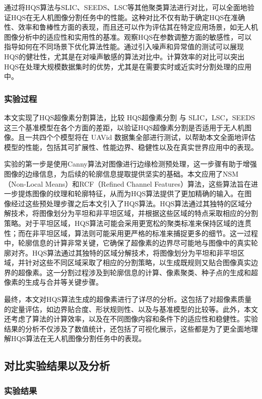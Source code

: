 通过将HQS算法与SLIC、SEEDS、LSC等其他聚类算法进行对比，可以全面地验证HQS在无人机图像分割任务中的性能。这种对比不仅有助于确定HQS在准确性、效率和鲁棒性方面的表现，而且还可以作为评估其在特定应用场景，如无人机图像分析中的适应性和实用性的基准。观察HQS在参数调整方面的敏感性，可以指导如何在不同场景下优化算法性能。通过引入噪声和异常值的测试可以展现HQS的健壮性，尤其是在对噪声敏感的算法对比中。计算效率的对比可以突出HQS在处理大规模数据集时的优势，尤其是在需要实时或近实时分割处理的应用中。

\subsubsection{实验过程}
本文实现了HQS超像素分割算法，比较 HQS超像素分割 与 SLIC，LSC，SEEDS 这三个基准模型在各个方面的差距，以验证HQS超像素分割是否适用于无人机图像。且一共四个个模型将在 UAVid 数据集全部进行测试，以帮助本文全面地评估模型的性能，包括其可扩展性、性能边界、稳健性以及在真实世界应用中的表现。

实验的第一步是使用Canny算法对图像进行边缘检测预处理，这一步骤有助于增强图像的边缘信息，为后续的轮廓信息提取提供坚实的基础。本文应用了NSM（Non-Local Means）和RCF（Refined Channel Features）算法，这些算法旨在进一步提炼图像的纹理和轮廓特征，从而为HQS算法提供了更加精确的输入。在图像经过这些预处理步骤之后本文引入了HQS算法。HQS算法通过其独特的区域分解技术，将图像划分为平坦和非平坦区域，并根据这些区域的特点采取相应的分割策略。对于平坦区域，HQS算法可能会采用更宽松的聚类标准来保持区域的连贯性；而在非平坦区域，算法则可能采用更严格的标准来捕捉更多的细节。这一过程中，轮廓信息的计算非常关键，它确保了超像素的边界尽可能地与图像中的真实轮廓对齐。HQS算法通过其独特的区域分解技术，将图像划分为平坦和非平坦区域，并针对这些不同区域采取了相应的分割策略，以生成既规则又贴合图像真实边界的超像素。这一分割过程涉及到轮廓信息的计算、像素聚类、种子点的生成和超像素的生成与合并等关键步骤。

最终，本文对HQS算法生成的超像素进行了详尽的分析。这包括了对超像素质量的定量评估，如边界贴合度、形状规则性、以及与基准模型的比较等。此外，本文还考虑了算法的计算效率，以及在不同图像内容和条件下的适应性和稳健性。实验结果的分析不仅涉及了数值统计，还包括了可视化展示，这些都是为了更全面地理解HQS算法在无人机图像分割任务中的表现。

\subsection{对比实验结果以及分析}

\subsubsection{实验结果}

